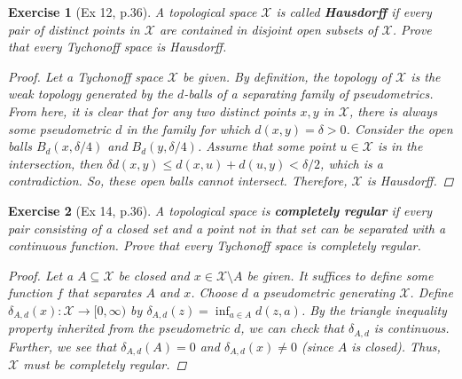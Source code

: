 \documentclass[11pt]{article}
\newtheorem{exercise}{Exercise}
\newcommand{\X}{\mathcal{X}}
\begin{document}
\begin{exercise}[{Ex 12, p.36}]
	A topological space $\X$ is called \textbf{Hausdorff} if every pair of distinct points in $\X$ are contained in disjoint open subsets of $\X$. Prove that every Tychonoff space is Hausdorff.

	\begin{proof}
		Let a Tychonoff space $\X$ be given. By definition, the topology of $\X$ is the weak topology generated by the $d$-balls of a separating family of pseudometrics. From here, it is clear that for any two distinct points $x,y$  in $\X$, there is always some pseudometric $d$ in the family for which $d(x,y) = \delta > 0$. Consider the open balls $B_d(x,\delta/4)$ and $B_d(y,\delta/4)$. Assume that some point $u\in \X$ is in the intersection, then $\delta d(x,y) \leq d(x,u) + d(u,y) < \delta/2$, which is a contradiction. So, these open balls cannot intersect. Therefore, $\X$ is Hausdorff.
	\end{proof}
\end{exercise}
\begin{exercise}[{Ex 14, p.36}]
	A topological space is \textbf{completely regular} if every pair consisting of a closed set and a point not in that set can be separated with a continuous function. Prove that every Tychonoff space is completely regular.
	\begin{proof}
		Let a $A\subseteq \X$ be closed and $x\in \X\setminus A$ be given. It suffices to define some function $f$ that separates $A$ and $x$. Choose $d$ a pseudometric generating $\X$. Define $\delta_{A,d}(x): \X \to [0,\infty)$ by $\delta_{A,d}(z) = \inf_{a\in A}d(z,a)$. By the triangle inequality property inherited from the pseudometric $d$, we can check that $\delta_{A,d}$ is continuous. Further, we see that $\delta_{A,d}(A) = 0$ and $\delta_{A,d}(x) \neq 0$ (since $A$ is closed). Thus, $\X$ must be completely regular. 
	\end{proof}
\end{exercise}
\end{document}
